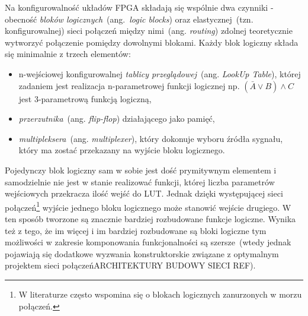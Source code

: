Na konfigurowalność układów FPGA składają się wspólnie dwa czynniki - obecność \textit{bloków logicznych}~(ang.~\textit{logic blocks}) oraz elastycznej~(tzn. konfigurowalnej) sieci połączeń między nimi~(ang. \textit{routing}) zdolnej teoretycznie wytworzyć połączenie pomiędzy dowolnymi blokami.
Każdy blok logiczny składa się minimalnie z trzech elementów:
\begin{itemize}
\item n-wejściowej konfigurowalnej \textit{tablicy przeglądowej}~(ang. \textit{LookUp Table}), której zadaniem jest realizacja n-parametrowej funkcji logicznej np. $(\bar{A}\vee B) \wedge C$ jest 3-parametrową funkcją logiczną,
\item \textit{przerzutnika}~(ang. \textit{flip-flop}) działającego jako pamięć,
\item \textit{multipleksera}~(ang. \textit{multiplexer}), który dokonuje wyboru źródła sygnału, który ma zostać przekazany na wyjście bloku logicznego.
\end{itemize}
Pojedynczy blok logiczny sam w sobie jest dość prymitywnym elementem i samodzielnie nie jest w stanie realizować funkcji, której liczba parametrów wejściowych przekracza ilość wejść do LUT. Jednak dzięki występującej sieci połączeń\footnote{W literaturze często wspomina się o blokach logicznych zanurzonych w morzu połączeń.} wyjście jednego bloku logicznego może stanowić wejście drugiego. W ten sposób tworzone są znacznie bardziej rozbudowane funkcje logiczne. Wynika też z tego, że im więcej i im bardziej rozbudowane są bloki logiczne tym możliwości w zakresie komponowania funkcjonalności są szersze~(wtedy jednak pojawiają się dodatkowe wyzwania konstruktorskie związane z optymalnym projektem sieci połączeń{\color{red}ARCHITEKTURY BUDOWY SIECI REF}).
